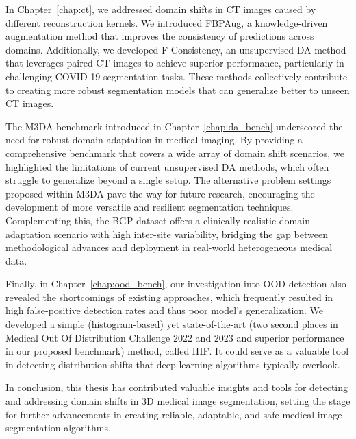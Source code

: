 In Chapter~\ref{chap:ct}, we addressed domain shifts in CT images caused by different reconstruction kernels. We introduced FBPAug, a knowledge-driven augmentation method that improves the consistency of predictions across domains. Additionally, we developed F-Consistency, an unsupervised DA method that leverages paired CT images to achieve superior performance, particularly in challenging COVID-19 segmentation tasks. These methods collectively contribute to creating more robust segmentation models that can generalize better to unseen CT images.

The M3DA benchmark introduced in Chapter~\ref{chap:da_bench} underscored the need for robust domain adaptation in medical imaging. By providing a comprehensive benchmark that covers a wide array of domain shift scenarios, we highlighted the limitations of current unsupervised DA methods, which often struggle to generalize beyond a single setup. The alternative problem settings proposed within M3DA pave the way for future research, encouraging the development of more versatile and resilient segmentation techniques. Complementing this, the BGP dataset offers a clinically realistic domain adaptation scenario with high inter-site variability, bridging the gap between methodological advances and deployment in real-world heterogeneous medical data.

Finally, in Chapter~\ref{chap:ood_bench}, our investigation into OOD detection also revealed the shortcomings of existing approaches, which frequently resulted in high false-positive detection rates and thus poor model's generalization. We developed a simple \linebreak (histogram-based) yet state-of-the-art (two second places in Medical Out Of Distribution Challenge 2022 and 2023 and superior performance in our proposed benchmark) method, called IHF. It could serve as a valuable tool in detecting distribution shifts that deep learning algorithms typically overlook.

In conclusion, this thesis has contributed valuable insights and tools for detecting and addressing domain shifts in 3D medical image segmentation, setting the stage for further advancements in creating reliable, adaptable, and safe medical image segmentation algorithms.



